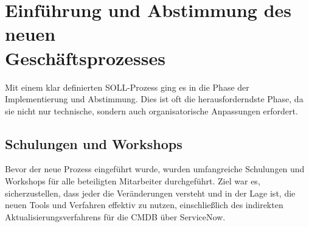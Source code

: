 \documentclass[12pt, a4paper]{article}
\begin{document}
\section{Einführung und Abstimmung des neuen\\ Geschäftsprozesses}

Mit einem klar definierten SOLL-Prozess ging es in die Phase der Implementierung und Abstimmung. Dies ist oft die herausforderndste Phase, da sie nicht nur technische, 
sondern auch organisatorische Anpassungen erfordert.

\subsection{Schulungen und Workshops}

Bevor der neue Prozess eingeführt wurde, wurden umfangreiche Schulungen und Workshops für alle beteiligten Mitarbeiter durchgeführt. Ziel war es, sicherzustellen, 
dass jeder die Veränderungen versteht und in der Lage ist, die neuen Tools und Verfahren effektiv zu nutzen, einschließlich des indirekten Aktualisierungsverfahrens für die 
CMDB über ServiceNow.
\end{document}
